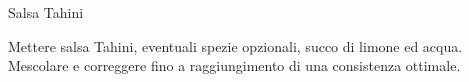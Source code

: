 \begin{recipe}[label=tahini]{Salsa Tahini}
    \begin{header}
    \end{header}
    
    \begin{ingredients}
    \end{ingredients}

    \begin{preparation}
        \step Mettere salsa Tahini, eventuali spezie opzionali, succo di limone ed acqua.
        \step Mescolare e correggere fino a raggiungimento di una consistenza ottimale.
    \end{preparation}
\end{recipe}
